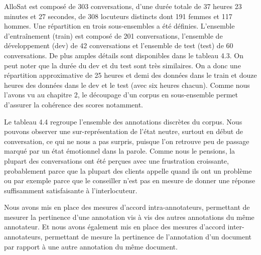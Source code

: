

AlloSat est composé de 303 conversations, d'une durée totale de 37 heures 23 minutes et 27 secondes, de 308 locuteurs distincts dont 191 femmes et 117 hommes.
Une répartition en trois sous-ensembles a été définies. L'ensemble d’entraînement (train) est composé de 201 conversations, l'ensemble de développement (dev) de 42 conversations et l'ensemble de test (test) de 60 conversations. De plus amples détails sont disponibles dans le tableau 4.3.
On peut noter que la durée du dev et du test sont très similaires. On a donc une répartition approximative de 25 heures et demi des données dans le train et douze heures des données dans le dev et le test (avec six heures chacun). Comme nous l'avons vu au chapitre 2, le découpage d'un corpus en sous-ensemble permet d'assurer la cohérence des scores notamment.



Le tableau 4.4
regroupe l'ensemble des annotations discrètes du corpus. Nous pouvons observer une sur-représentation de l'état neutre, surtout en début de conversation, ce qui ne nous a pas surpris, puisque l'on retrouve peu de passage marqué par un état émotionnel dans la parole. Comme nous le pensions, la plupart des conversations ont été perçues avec une frustration croissante, probablement parce que la plupart des clients appelle quand ils ont un problème ou par exemple parce que le conseiller n’est pas en mesure de donner une réponse suffisamment satisfaisante à l’interlocuteur.

Nous avons mis en place des mesures d'accord intra-annotateurs, permettant de mesurer la pertinence d'une annotation vis à vis des autres annotations du même annotateur. Et nous avons également mis en place des mesures d'accord inter-annotateurs, permettant de mesure la pertinence de l'annotation d'un document par rapport à une autre annotation du même document. %

